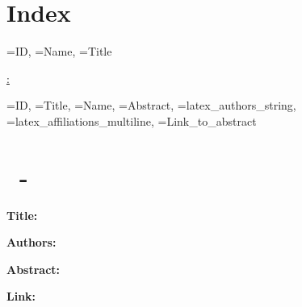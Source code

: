 \documentclass[a4paper,12pt]{article}
\begin{document}


\section*{Index}

\begin{itemize}
  {\ID=ID,
  \IndexName=Name,
  \IndexTitle=Title}
  {\item \textbf{\ID} \hyperref[abs:\ID]{\IndexName: \IndexTitle}}
\end{itemize}

\newpage

  {\ID=ID,
  \Title=Title, 
  \Name=Name, 
  \Abstract=Abstract, 
  \Authors=latex_authors_string, 
  \Affiliations=latex_affiliations_multiline,
  \URL=Link_to_abstract}
  {
    \section*{\ID\ - \Name}
    \label{abs:\ID}

    \textbf{Title:} \Title

    \textbf{Authors:} \Authors


    \textbf{Abstract:} \Abstract

    \textbf{Link:} \href{\URL}{\URL}

    \newpage
  }
\end{document}
